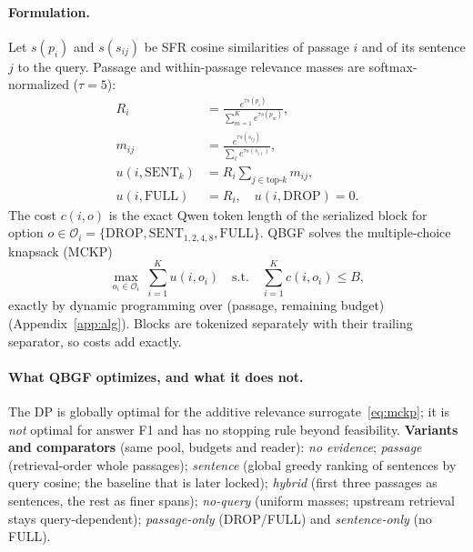 \documentclass[10pt,twocolumn,letterpaper]{article}
\begin{document}
\paragraph{Formulation.} Let $s(p_i)$ and $s(s_{ij})$ be SFR cosine similarities of passage $i$ and of its sentence $j$ to the query. Passage and within-passage relevance masses are softmax-normalized ($\tau{=}5$):
\begin{align}
R_i&=\frac{e^{\tau s(p_i)}}{\sum_{m=1}^{K}e^{\tau s(p_m)}},\nonumber\\
m_{ij}&=\frac{e^{\tau s(s_{ij})}}{\sum_{\ell}e^{\tau s(s_{i\ell})}},\label{eq:mass}\\
u(i,\mathrm{SENT}_k)&=R_i\sum_{j\in\mathrm{top}\text{-}k}m_{ij},\nonumber\\
u(i,\mathrm{FULL})&=R_i,\quad u(i,\mathrm{DROP})=0.\nonumber
\end{align}
The cost $c(i,o)$ is the exact Qwen token length of the serialized block for option $o\in\mathcal O_i=\{\mathrm{DROP},\mathrm{SENT}_{1,2,4,8},\mathrm{FULL}\}$. QBGF solves the multiple-choice knapsack (MCKP)
\begin{equation}
\max_{o_i\in\mathcal O_i}\ \sum_{i=1}^{K}u(i,o_i)\quad\text{s.t.}\quad\sum_{i=1}^{K}c(i,o_i)\le B,\label{eq:mckp}
\end{equation}
exactly by dynamic programming over (passage, remaining budget) (Appendix~\ref{app:alg}). Blocks are tokenized separately with their trailing separator, so costs add exactly.

\paragraph{What QBGF optimizes, and what it does not.} The DP is globally optimal for the additive relevance surrogate~\eqref{eq:mckp}; it is \emph{not} optimal for answer F1 and has no stopping rule beyond feasibility. \textbf{Variants and comparators} (same pool, budgets and reader): \emph{no evidence}; \emph{passage} (retrieval-order whole passages); \emph{sentence} (global greedy ranking of sentences by query cosine; the baseline that is later locked); \emph{hybrid} (first three passages as sentences, the rest as finer spans); \emph{no-query} (uniform masses; upstream retrieval stays query-dependent); \emph{passage-only} (DROP/FULL) and \emph{sentence-only} (no FULL).
\end{document}
